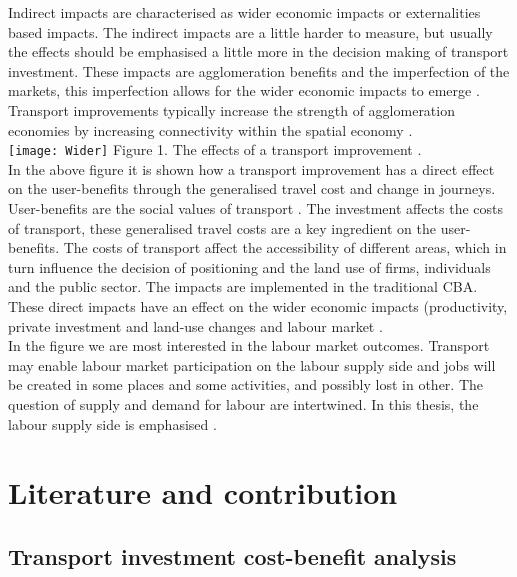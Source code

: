 \documentclass[a4paper, 12 pt]{article}   	%
\begin{document}
Indirect impacts are characterised as wider economic impacts or externalities based impacts. The indirect impacts are a little harder to measure, but usually the effects should be emphasised a little more in the decision making of transport investment. These impacts are agglomeration benefits and the imperfection of the markets, this imperfection allows for the wider economic impacts to emerge \citep{laakso}. Transport improvements typically increase the strength of agglomeration economies by increasing connectivity within the spatial economy \citep{melo}. \\

\texttt{[image: Wider]}
Figure 1. The effects of a transport improvement \citep{venables2017}. \\

In the above figure it is shown how a transport improvement has a direct effect on the user-benefits through the generalised travel cost and change in journeys. User-benefits are the social values of transport \citep{venables2017}.  The investment affects the costs of transport, these generalised travel costs are a key ingredient on the user-benefits. The costs of transport affect the accessibility of different areas, which in turn influence the decision of positioning and the land use of firms, individuals and the public sector. The impacts are implemented in the traditional CBA. \citep{laakso} These direct impacts have an effect on the wider economic impacts (productivity, private investment and land-use changes and labour market \citep{venables2017}. \\

In the figure we are most interested in the labour market outcomes. Transport may enable labour market participation on the labour supply side and jobs will be created in some places and some activities, and possibly lost in other. The question of supply and demand for labour are intertwined. In this thesis, the labour supply side is emphasised \citep{venables2017}. \\

\section{Literature and contribution} 

\subsection{Transport investment cost-benefit analysis}
\end{document}
